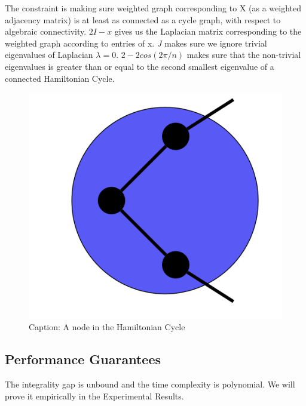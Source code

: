 \documentclass{article}
\begin{document}
The constraint is making sure weighted graph corresponding to X (as a weighted adjacency matrix) is at least as connected as a cycle graph, with respect to algebraic connectivity. $2I-x$ gives us the Laplacian matrix corresponding to the weighted graph according to entries of x. $J$ makes sure we ignore trivial eigenvalues of Laplacian $\lambda = 0$. $2-2cos(2\pi/n)$ makes sure that the non-trivial eigenvalues is greater than or equal to the second smallest eigenvalue of a connected Hamiltonian Cycle.
\begin{figure}[!ht]
    \centering
    \includegraphics{assets/degrees.png}
    \caption{Caption: A node in the Hamiltonian Cycle}
    \label{fig:degrees}
\end{figure}
\subsection{Performance Guarantees}
The integrality gap is unbound and the time complexity is polynomial. We will prove it empirically in the Experimental Results.  

\end{document}
